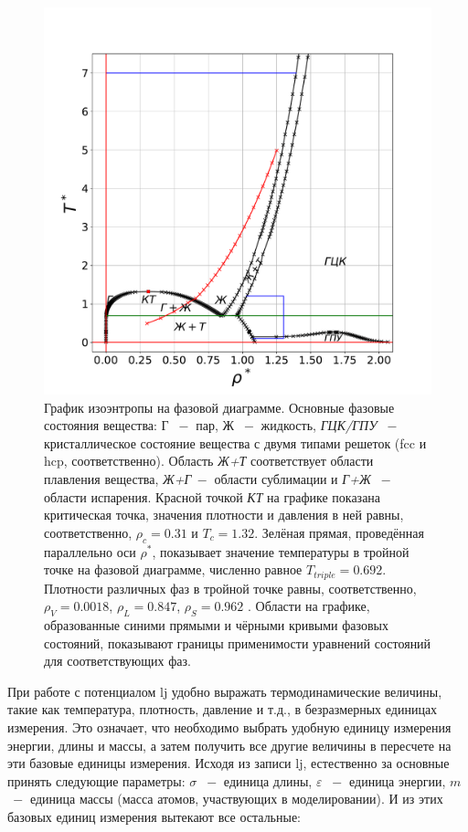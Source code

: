 \begin{figure}[ht]
    \includegraphics[width=\linewidth]{img/Isontropa.pdf}
    \caption{\label{fig:iso_S} График изоэнтропы на фазовой диаграмме. Основные фазовые состояния вещества: $Г$ $~-$ пар, $Ж$ $~-$ жидкость, \textit{ГЦК/ГПУ} $~-$ кристаллическое состояние вещества с двумя типами решеток (\acrshort{fcc} и \acrshort{hcp}, соответственно). Область \textit{Ж+Т} соответствует области плавления вещества, \textit{Ж+Г}$~-$ области сублимации и \textit{Г+Ж} $~-$ области испарения. Красной точкой \textit{КТ} на графике показана критическая точка, значения плотности и давления в ней равны, соответственно, $\rho_c = 0.31$ и $T_c = 1.32$. Зелёная прямая, проведённая параллельно оси $\rho^*$, показывает значение температуры в тройной точке на фазовой диаграмме, численно равное $T_{triple} = 0.692$. Плотности различных фаз в тройной точке равны, соответственно, $\rho_V = 0.0018$, $\rho_L = 0.847$, $\rho_S = 0.962$ \cite{Baidakov:JETP:2006}. Области на графике, образованные синими прямыми и чёрными кривыми фазовых состояний, показывают границы применимости уравнений состояний для соответствующих фаз.}
\end{figure}

При работе с потенциалом \acrshort{lj} удобно выражать термодинамические величины, такие как температура, плотность, давление и т.д., в безразмерных единицах измерения. Это означает, что необходимо выбрать удобную единицу измерения энергии, длины и массы, а затем получить все другие величины в пересчете на эти базовые единицы измерения. Исходя из записи \acrshort{lj}, естественно за основные принять следующие параметры: $\sigma$ $~-$ единица длины, $\varepsilon$ $~-$ единица энергии, $m$ $~-$ единица массы (масса атомов, участвующих в моделировании). И из этих базовых единиц измерения вытекают все остальные:

